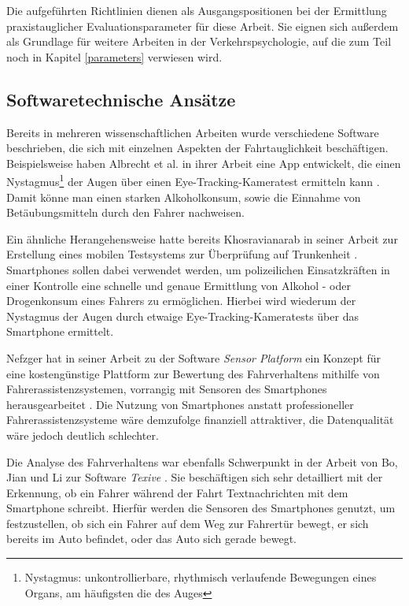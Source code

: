 Die aufgeführten Richtlinien dienen als Ausgangspositionen bei der Ermittlung praxistauglicher Evaluationsparameter für diese Arbeit. Sie eignen sich außerdem als Grundlage für weitere Arbeiten in der Verkehrspsychologie, auf die zum Teil noch in Kapitel \ref{parameters} verwiesen wird.

\subsection{Softwaretechnische Ansätze}

Bereits in mehreren wissenschaftlichen Arbeiten wurde verschiedene Software beschrieben, die sich mit einzelnen Aspekten der Fahrtauglichkeit beschäftigen. Beispielsweise haben Albrecht et al. in ihrer Arbeit eine App entwickelt, die einen Nystagmus\footnote{\label{foot:nystagmus} Nystagmus: unkontrollierbare, rhythmisch verlaufende Bewegungen eines Organs, am häufigsten die des Auges}  der Augen über einen Eye-Tracking-Kameratest ermitteln kann \cite{mobilesmarttracking}. Damit könne man einen starken Alkoholkonsum, sowie die Einnahme von Betäubungsmitteln durch den Fahrer nachweisen.

Ein ähnliche Herangehensweise hatte bereits Khosravianarab in seiner Arbeit zur Erstellung eines mobilen Testsystems zur Überprüfung auf Trunkenheit \cite{sobrietymobiletests}. Smartphones sollen dabei verwendet werden, um polizeilichen Einsatzkräften in einer Kontrolle eine schnelle und genaue Ermittlung von Alkohol - oder Drogenkonsum eines Fahrers zu ermöglichen. Hierbei wird wiederum der Nystagmus der Augen durch etwaige Eye-Tracking-Kameratests über das Smartphone ermittelt.

Nefzger hat in seiner Arbeit zu der Software \textit{Sensor Platform} ein Konzept für eine kostengünstige Plattform zur Bewertung des Fahrverhaltens mithilfe von Fahrerassistenzsystemen, vorrangig mit Sensoren des Smartphones herausgearbeitet \cite{smartphoneresearchplatform}. Die Nutzung von Smartphones anstatt professioneller Fahrerassistenzsysteme wäre demzufolge finanziell attraktiver, die Datenqualität wäre jedoch deutlich schlechter.

Die Analyse des Fahrverhaltens war ebenfalls Schwerpunkt in der Arbeit von Bo, Jian und Li zur Software \textit{Texive} \cite{texive}. Sie beschäftigen sich sehr detailliert mit der Erkennung, ob ein Fahrer während der Fahrt Textnachrichten mit dem Smartphone schreibt. Hierfür werden die Sensoren des Smartphones genutzt, um festzustellen, ob sich ein Fahrer auf dem Weg zur Fahrertür bewegt, er sich bereits im Auto befindet, oder das Auto sich gerade bewegt.

